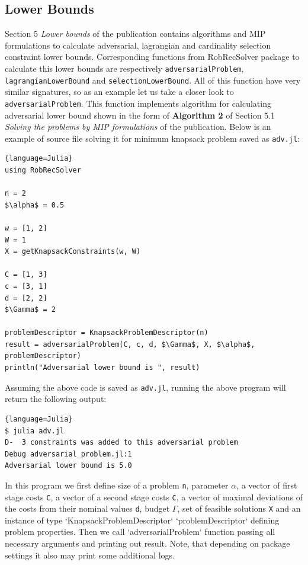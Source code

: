 \subsection{Lower Bounds}
Section 5 \textit{Lower bounds} of the publication contains algorithms and MIP formulations to calculate adversarial, lagrangian and cardinality selection constraint lower bounds. Corresponding functions from RobRecSolver package to calculate this lower bounds are respectively \texttt{adversarialProblem}, \texttt{lagrangianLowerBound} and \texttt{selectionLowerBound}. All of this function have very similar signatures, so as an example let us take a closer look to \texttt{adversarialProblem}. This function implements algorithm for calculating adversarial lower bound shown in the form of \textbf{Algorithm 2} of Section 5.1 \textit{Solving the problems by MIP formulations} of the publication. Below is an example of source file solving it for minimum knapsack problem saved as \texttt{adv.jl}:
\begin{lstlisting}[mathescape]{language=Julia}
using RobRecSolver

n = 2
$\alpha$ = 0.5

w = [1, 2]
W = 1
X = getKnapsackConstraints(w, W)

C = [1, 3]
c = [3, 1]
d = [2, 2]
$\Gamma$ = 2

problemDescriptor = KnapsackProblemDescriptor(n)
result = adversarialProblem(C, c, d, $\Gamma$, X, $\alpha$, problemDescriptor)
println("Adversarial lower bound is ", result)
\end{lstlisting}
Assuming the above code is saved as \texttt{adv.jl}, running the above program will return the following output:
\begin{lstlisting}{language=Julia}
$ julia adv.jl
D-  3 constraints was added to this adversarial problem               Debug adversarial_problem.jl:1
Adversarial lower bound is 5.0
\end{lstlisting}
In this program we first define size of a problem \texttt{n}, parameter  \texttt{$\alpha$}, a vector of first stage costs  \texttt{C}, a vector of a second stage costs  \texttt{C}, a vector of maximal deviations of the costs from their nominal values  \texttt{d}, budget  \texttt{$\Gamma$}, set of feasible solutions \texttt{X} and an instance of type `KnapsackProblemDescriptor` `problemDescriptor` defining problem properties. Then we call `adversarialProblem` function passing all necessary arguments and printing out result. Note, that depending on package settings it also may print some additional logs.


